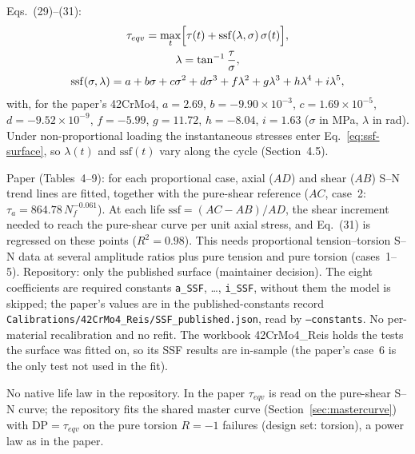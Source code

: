  Eqs.~(29)--(31):
\begin{gather}
\tau_{eqv} = \max_t\Bigl[\tau(t) + \mathrm{ssf}(\lambda,\sigma)\,\sigma(t)\Bigr] , \label{eq:ssf-main}\\
\lambda = \tan^{-1}\frac{\tau}{\sigma} , \label{eq:ssf-lambda}\\
\mathrm{ssf}(\sigma,\lambda) = a + b\sigma + c\sigma^2 + d\sigma^3 + f\lambda^2 + g\lambda^3 + h\lambda^4 + i\lambda^5 ,
\label{eq:ssf-surface}
\end{gather}
with, for the paper's 42CrMo4, $a=2.69$, $b=-9.90\times10^{-3}$, $c=1.69\times10^{-5}$,
$d=-9.52\times10^{-9}$, $f=-5.99$, $g=11.72$, $h=-8.04$, $i=1.63$ ($\sigma$ in MPa, $\lambda$ in rad).
Under non-proportional loading the instantaneous stresses enter Eq.~\eqref{eq:ssf-surface}, so
$\lambda(t)$ and $\mathrm{ssf}(t)$ vary along the cycle (Section~4.5).

 Paper (Tables~4--9): for each proportional case, axial ($AD$) and shear
($AB$) S--N trend lines are fitted, together with the pure-shear reference ($AC$, case~2:
$\tau_a=864.78\,N_f^{-0.061}$). At each life $\mathrm{ssf}=(AC-AB)/AD$, the shear increment needed to
reach the pure-shear curve per unit axial stress, and Eq.~(31) is regressed on these points
($R^2=0.98$). This needs proportional tension--torsion S--N data at several amplitude ratios plus pure
tension and pure torsion (cases~1--5). Repository: only the published surface (maintainer decision).
The eight coefficients are required constants \texttt{a\_SSF}, \dots, \texttt{i\_SSF}, without them the
model is skipped; the paper's values are in the published-constants record
\texttt{Calibrations/42CrMo4\_Reis/SSF\_published.json}, read by \texttt{--constants}. No per-material
recalibration and no refit. The workbook 42CrMo4\_Reis holds the tests the surface was fitted on, so
its SSF results are in-sample (the paper's case~6 is the only test not used in the fit).

 No native life law in the repository. In the paper $\tau_{eqv}$ is read on the pure-shear
S--N curve; the repository fits the shared master curve (Section~\ref{sec:mastercurve}) with
$\mathrm{DP}=\tau_{eqv}$ on the pure torsion $R=-1$ failures (design set: torsion), a power law as in
the paper.

